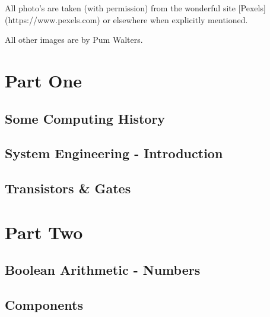 All photo's are taken (with permission) from the wonderful site [Pexels](https://www.pexels.com) 
or elsewhere when explicitly mentioned.

All other images are by Pum Walters.




\part{Part One}

\chapter{Some Computing History}



\chapter{System Engineering - Introduction}




\chapter{Transistors \& Gates}



\part{Part Two}


\chapter{Boolean Arithmetic - Numbers}




\chapter{Components}




